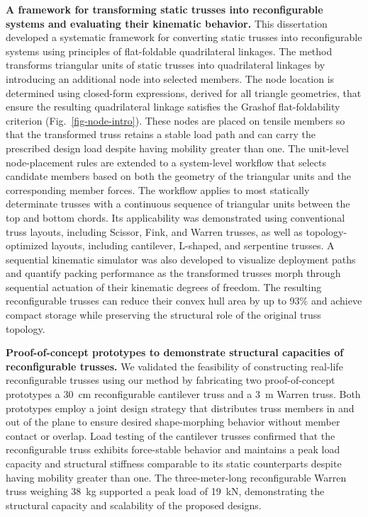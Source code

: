 \noindent{}\textbf{A framework for transforming static trusses into reconfigurable systems and evaluating their kinematic behavior.}
This dissertation developed a systematic framework for converting static trusses into reconfigurable systems using principles of flat-foldable quadrilateral linkages. The method transforms triangular units of static trusses into quadrilateral linkages by introducing an additional node into selected members. The node location is determined using closed-form expressions, derived for all triangle geometries, that ensure the resulting quadrilateral linkage satisfies the Grashof flat-foldability criterion (Fig.~\ref{fig-node-intro}). These nodes are placed on tensile members so that the transformed truss retains a stable load path and can carry the prescribed design load despite having mobility greater than one. The unit-level node-placement rules are extended to a system-level workflow that selects candidate members based on both the geometry of the triangular units and the corresponding member forces. The workflow applies to most statically determinate trusses with a continuous sequence of triangular units between the top and bottom chords. Its applicability was demonstrated using conventional truss layouts, including Scissor, Fink, and Warren trusses, as well as topology-optimized layouts, including cantilever, L-shaped, and serpentine trusses. A sequential kinematic simulator was also developed to visualize deployment paths and quantify packing performance as the transformed trusses morph through sequential actuation of their kinematic degrees of freedom. The resulting reconfigurable trusses can reduce their convex hull area by up to 93\% and achieve compact storage while preserving the structural role of the original truss topology.

\noindent{}\textbf{Proof-of-concept prototypes to demonstrate structural capacities of reconfigurable trusses.} We validated the feasibility of constructing real-life reconfigurable trusses using our method by fabricating two proof-of-concept prototypes \textemdash{} a 30~cm reconfigurable cantilever truss and a 3~m Warren truss. Both prototypes employ a joint design strategy that distributes truss members in and out of the plane to ensure desired shape-morphing behavior without member contact or overlap. Load testing of the cantilever trusses confirmed that the reconfigurable truss exhibits force-stable behavior and maintains a peak load capacity and structural stiffness comparable to its static counterparts despite having mobility greater than one. The three-meter-long reconfigurable Warren truss weighing 38~kg supported a peak load of 19~kN, demonstrating the structural capacity and scalability of the proposed designs.

